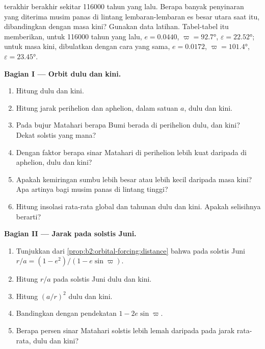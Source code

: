 \begin{problem}\label{pb:b2:orbital-forcing:1}
 terakhir berakhir sekitar \num{116000} tahun yang lalu. Berapa banyak penyinaran yang diterima musim panas di
lintang lembaran-lembaran es besar utara saat itu, dibandingkan dengan masa kini? Gunakan data
latihan. Tabel-tabel itu memberikan, untuk \num{116000} tahun yang lalu, $e = 0.0440$, $\varpi = \ang{92.7}$,
$\varepsilon = \ang{22.52}$; untuk masa kini, dibulatkan dengan cara yang sama, $e = 0.0172$, $\varpi = \ang{101.4}$,
$\varepsilon = \ang{23.45}$.

\medskip\noindent\textbf{Bagian I --- Orbit dulu dan kini.}
\begin{enumerate}
  \item Hitung  dulu dan kini.
  \item Hitung jarak perihelion dan aphelion, dalam satuan $a$, dulu dan kini.
  \item Pada bujur Matahari berapa Bumi berada di perihelion dulu, dan kini? Dekat solstis yang mana?
  \item Dengan faktor berapa sinar Matahari di perihelion lebih kuat daripada di aphelion, dulu dan kini?
  \item Apakah kemiringan sumbu lebih besar atau lebih kecil daripada masa kini? Apa artinya bagi musim panas di
        lintang tinggi?
  \item Hitung insolasi rata-rata global dan tahunan dulu dan kini. Apakah selisihnya berarti?
\end{enumerate}

\medskip\noindent\textbf{Bagian II --- Jarak pada solstis Juni.}
\begin{enumerate}[resume]
  \item Tunjukkan dari \cref{prop:b2:orbital-forcing:distance} bahwa pada solstis Juni $r/a = (1 -
        e^2)/(1 - e\sin\varpi)$.
  \item Hitung $r/a$ pada solstis Juni dulu dan kini.
  \item Hitung $(a/r)^2$ dulu dan kini.
  \item Bandingkan dengan pendekatan $1 - 2e\sin\varpi$.
  \item Berapa persen sinar Matahari solstis lebih lemah daripada pada jarak rata-rata, dulu dan kini?
\end{enumerate}


\end{problem}
